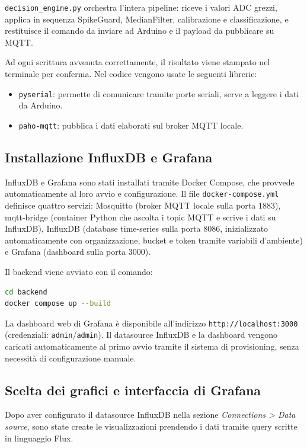 \documentclass{article}
\begin{document}
\texttt{decision\_engine.py} orchestra l'intera pipeline: riceve i valori ADC
grezzi, applica in sequenza SpikeGuard, MedianFilter, calibrazione e
classificazione, e restituisce il comando da inviare ad Arduino e il payload
da pubblicare su MQTT.

Ad ogni scrittura avvenuta correttamente, il risultato viene stampato nel
terminale per conferma. Nel codice vengono usate le seguenti librerie:

\begin{itemize}
    \item \texttt{pyserial}: permette di comunicare tramite porte seriali,
          serve a leggere i dati da Arduino.
    \item \texttt{paho-mqtt}: pubblica i dati elaborati sul broker MQTT locale.
\end{itemize}

\subsection{Installazione InfluxDB e Grafana}

InfluxDB e Grafana sono stati installati tramite Docker Compose, che provvede
automaticamente al loro avvio e configurazione. Il file
\texttt{docker-compose.yml} definisce quattro servizi: Mosquitto (broker MQTT
locale sulla porta 1883), mqtt-bridge (container Python che ascolta i topic
MQTT e scrive i dati su InfluxDB), InfluxDB (database time-series sulla porta
8086, inizializzato automaticamente con organizzazione, bucket e token tramite
variabili d'ambiente) e Grafana (dashboard sulla porta 3000).

Il backend viene avviato con il comando:
\begin{lstlisting}[language=bash]
cd backend
docker compose up --build
\end{lstlisting}

La dashboard web di Grafana è disponibile all'indirizzo
\texttt{http://localhost:3000} (credenziali: \texttt{admin}/\texttt{admin}).
Il datasource InfluxDB e la dashboard vengono caricati automaticamente al
primo avvio tramite il sistema di provisioning, senza necessità di
configurazione manuale.

\subsection{Scelta dei grafici e interfaccia di Grafana}

Dopo aver configurato il datasource InfluxDB nella sezione
\textit{Connections > Data source}, sono state create le visualizzazioni
prendendo i dati tramite query scritte in linguaggio Flux.
\end{document}
